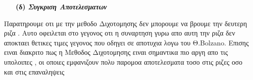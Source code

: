 \documentclass[a4paper,11pt]{article}
\begin{document}
	
	\begin{enumerate}
		\item[\textbf{(δ)}] \emph {\textbf{Συγκριση Αποτελεσματων}}
	\end{enumerate}
	\begin{enumerate}
		\item[\text{1.}]  {
			\begin{enumerate}
				\item[\text{(a)}]{}
				\item[\text{(b)}]{}
				\item[\text{(c)}]{}
				\item[\text{(d)}]{}
				\item[\text{(e)}]{}
			\end{enumerate}
		}
		\item[\text{2.}]  {
			\begin{enumerate}
				\item[\text{(a)}]{}
				\item[\text{(b)}]{}
				\item[\text{(c)}]{}
				\item[\text{(d)}]{}
				\item[\text{(e)}]{}
			\end{enumerate}
		}
		\item[\text{3.}]  {
			\begin{enumerate}
				\item[\text{(a)}]{}
				\item[\text{(b)}]{}
				\item[\text{(c)}]{}
				\item[\text{(d)}]{}
				\item[\text{(e)}]{}
			\end{enumerate}
		}
		
		
	\end{enumerate}
		\begin{center}
			Παρατηρουμε οτι με την μεθοδο Διχοτομησης δεν μπορουμε να βρουμε την δευτερη ριζα . Αυτο οφειλεται στο γεγονος οτι η συναρτηση γυρω απο αυτη την ριζα δεν αποκταει θετικες τιμες γεγονος που οδηγει σε αποτυχια λογω του Θ.Bolzano. Επισης ειναι διακριτο πως η Μεθοδος Διχοτομησης ειναι σημαντικα πιο αργη απο τις υπολοιπες , οι οποιες εμφανιζουν πολυ παρομοα αποτελεσματα τοσο στις ριζες οσο και στις επαναληψεις
		\end{center}
		
\end{document}
